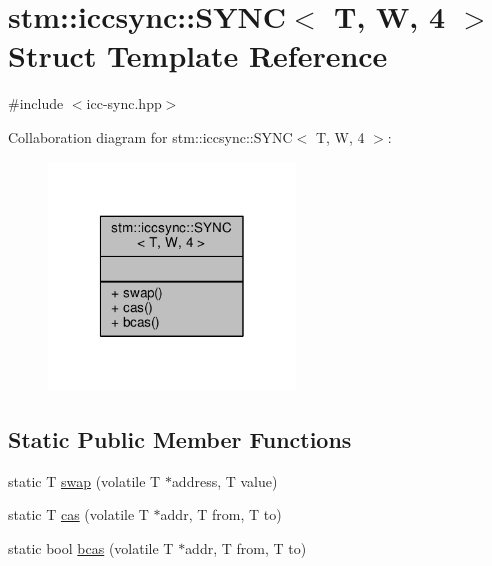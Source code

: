 \hypertarget{structstm_1_1iccsync_1_1SYNC_3_01T_00_01W_00_014_01_4}{\section{stm\-:\-:iccsync\-:\-:S\-Y\-N\-C$<$ T, W, 4 $>$ Struct Template Reference}
\label{structstm_1_1iccsync_1_1SYNC_3_01T_00_01W_00_014_01_4}
}


{\ttfamily \#include $<$icc-\/sync.\-hpp$>$}



Collaboration diagram for stm\-:\-:iccsync\-:\-:S\-Y\-N\-C$<$ T, W, 4 $>$\-:
\nopagebreak
\begin{figure}[H]
\begin{center}
\leavevmode
\includegraphics[width=186pt]{structstm_1_1iccsync_1_1SYNC_3_01T_00_01W_00_014_01_4__coll__graph}
\end{center}
\end{figure}
\subsection*{Static Public Member Functions}
\begin{DoxyCompactItemize}
\item 
static T \hyperlink{structstm_1_1iccsync_1_1SYNC_3_01T_00_01W_00_014_01_4_ae5f0ccc5f50dc89ab383ba1b8edf6b69}{swap} (volatile T $\ast$address, T value)
\item 
static T \hyperlink{structstm_1_1iccsync_1_1SYNC_3_01T_00_01W_00_014_01_4_a7d8b0fe5c5a352fe7fb434601e9dafbc}{cas} (volatile T $\ast$addr, T from, T to)
\item 
static bool \hyperlink{structstm_1_1iccsync_1_1SYNC_3_01T_00_01W_00_014_01_4_a0c290449e238ccf7dc5ae9f2267bc21c}{bcas} (volatile T $\ast$addr, T from, T to)
\end{DoxyCompactItemize}


